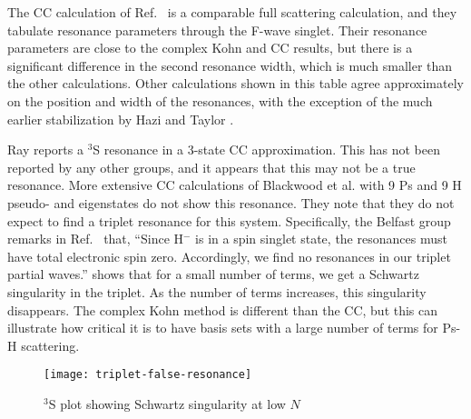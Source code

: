 \documentclass[Dissertation.tex]{subfiles}
\begin{document}
The CC calculation of Ref.~\cite{Walters2004} is a comparable full scattering calculation, and they tabulate resonance parameters through the F-wave singlet. Their resonance parameters are close to the complex Kohn and CC results, but there is a significant difference in the second resonance width, which is much smaller than the other calculations. Other calculations shown in this table agree approximately on the position and width of the resonances, with the exception of the much earlier stabilization by Hazi and Taylor \cite{Hazi1970}.


Ray \cite{Ray2006} reports a $^3$S resonance in a 3-state CC approximation. This has not been reported by any other groups, and it appears that this may not be a true resonance. 
More extensive CC calculations of Blackwood et al. \cite{Blackwood2002} with 9 Ps and 9 H pseudo- and eigenstates do not show this resonance. They note that they do not expect to find a triplet resonance for this system. Specifically, the Belfast group remarks in Ref.~\cite{Campbell1998} that, ``Since H$^-$ is in a spin singlet state, the resonances must have total electronic spin zero. Accordingly, we find no resonances in our triplet partial waves.''  shows that for a small number of terms, we get a Schwartz singularity in the triplet. As the number of terms increases, this singularity disappears. The complex Kohn method is different than the CC, but this can illustrate how critical it is to have basis sets with a large number of terms for Ps-H scattering.

\begin{figure}[H]
	\centering
	\texttt{[image: triplet-false-resonance]}
	\caption{$^3$S plot showing Schwartz singularity at low $N$}
	\label{fig:triplet-false-resonance}
\end{figure}





\biblio
\end{document}
